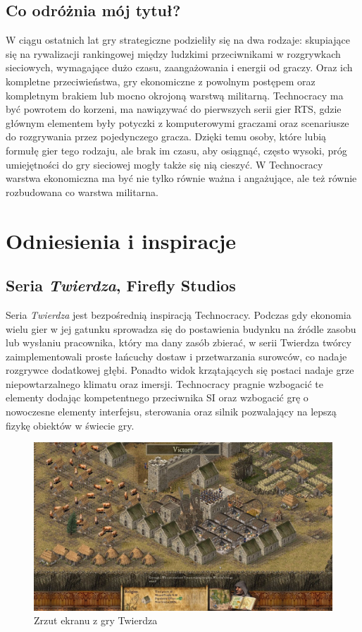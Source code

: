 \documentclass[a4paper]{scrreprt}
\def \GameTiTle{Technocracy}
\begin{document}
\section{Co odróżnia mój tytuł?}
W ciągu ostatnich lat gry strategiczne podzieliły się na dwa rodzaje: skupiające się na rywalizacji rankingowej między ludzkimi przeciwnikami w rozgrywkach sieciowych, wymagające dużo czasu, zaangażowania i energii od graczy. Oraz ich kompletne przeciwieństwa, gry ekonomiczne z powolnym postępem oraz kompletnym brakiem lub mocno okrojoną warstwą militarną.
\GameTiTle{} ma być powrotem do korzeni, ma nawiązywać do pierwszych serii gier RTS, gdzie głównym elementem były potyczki z komputerowymi graczami oraz scenariusze do rozgrywania przez pojedynczego gracza. Dzięki temu osoby, które lubią formułę gier tego rodzaju, ale brak im czasu, aby osiągnąć, często wysoki, próg umiejętności do gry sieciowej mogły także się nią cieszyć. 
W \GameTiTle{} warstwa ekonomiczna ma być nie tylko równie ważna i angażujące, ale też równie rozbudowana co warstwa militarna.


\chapter{Odniesienia i inspiracje} 

\section{Seria \emph{Twierdza}, Firefly Studios}
Seria \emph{Twierdza} jest bezpośrednią 
inspiracją \GameTiTle{}. Podczas gdy ekonomia wielu gier w jej gatunku sprowadza się do postawienia budynku na źródle zasobu lub wysłaniu pracownika, który ma dany zasób zbierać, w serii Twierdza twórcy zaimplementowali proste łańcuchy dostaw i przetwarzania surowców, co nadaje rozgrywce dodatkowej głębi. Ponadto widok krzątających się postaci nadaje grze niepowtarzalnego klimatu oraz imersji. \GameTiTle{} pragnie wzbogacić te elementy dodając kompetentnego przeciwnika SI oraz wzbogacić grę o nowoczesne elementy interfejsu, sterowania oraz silnik pozwalający na lepszą fizykę obiektów w świecie gry.

\begin{figure}[hb]
\centering
\includegraphics[width=1\textwidth]{stronghold2.jpg}
\caption{\label{} Zrzut ekranu z gry Twierdza}
\end{figure}
\newpage
\end{document}
